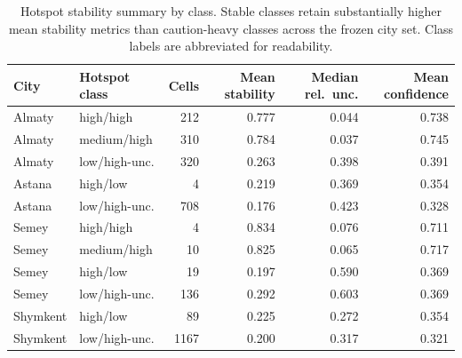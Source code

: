 \begin{table}[H]
\centering
\small
\caption{Hotspot stability summary by class. Stable classes retain substantially higher mean stability metrics than caution-heavy classes across the frozen city set. Class labels are abbreviated for readability.}
\label{tab:hotspot-stability}
\begin{tabular}{lp{2.8cm}rrrr}
\toprule
City & Hotspot class & Cells & Mean stability & Median rel.\ unc. & Mean confidence \\
\midrule
Almaty   & high/high      & 212  & 0.777 & 0.044 & 0.738 \\
Almaty   & medium/high    & 310  & 0.784 & 0.037 & 0.745 \\
Almaty   & low/high-unc.  & 320  & 0.263 & 0.398 & 0.391 \\
Astana   & high/low       & 4    & 0.219 & 0.369 & 0.354 \\
Astana   & low/high-unc.  & 708  & 0.176 & 0.423 & 0.328 \\
Semey    & high/high      & 4    & 0.834 & 0.076 & 0.711 \\
Semey    & medium/high    & 10   & 0.825 & 0.065 & 0.717 \\
Semey    & high/low       & 19   & 0.197 & 0.590 & 0.369 \\
Semey    & low/high-unc.  & 136  & 0.292 & 0.603 & 0.369 \\
Shymkent & high/low       & 89   & 0.225 & 0.272 & 0.354 \\
Shymkent & low/high-unc.  & 1167 & 0.200 & 0.317 & 0.321 \\
\bottomrule
\end{tabular}
\end{table}
